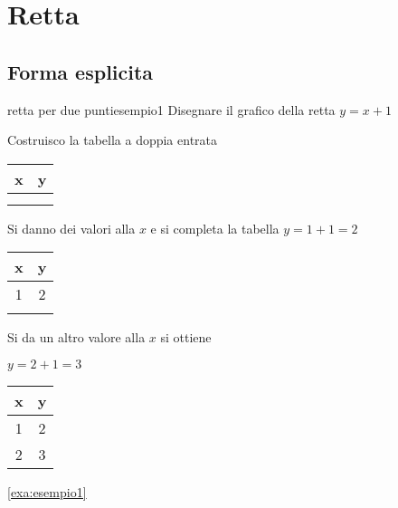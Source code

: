 \chapter{Retta}
\label{cha:retta}
\section{Forma esplicita}
\begin{esempiot}{retta per due punti}{esempio1}
	Disegnare il grafico della retta $y=x+1$
\end{esempiot}
Costruisco la tabella a doppia entrata 
\begin{tabular}{c|c}
	 x & y\\
	\hline 
  &  \\ 
	 &  \\ 
\end{tabular}
 
Si danno dei valori alla $x$ e si completa la tabella
$y=1+1=2$

\begin{tabular}{c|c}
	x & y\\
	\hline 
1	& 2 \\ 
	&  \\ 
\end{tabular}

Si da un altro valore alla $x$ si ottiene 

$y=2+1=3$

\begin{tabular}{c|c}
	x & y\\
	\hline 
	1	& 2 \\ 
	2& 3 \\ 
\end{tabular}


\cref{exa:esempio1} 

